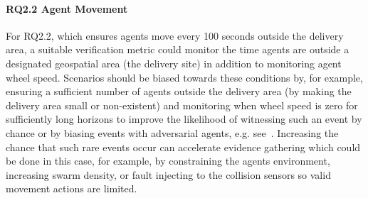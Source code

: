 \documentclass[lettersize,journal]{IEEEtran}
\begin{document}
\paragraph*{RQ2.2 Agent Movement}

For RQ2.2, which ensures agents move every 100 seconds outside the delivery area, a suitable verification metric could monitor the time agents are outside a designated geospatial area (the delivery site) in addition to monitoring agent wheel speed. Scenarios should be biased towards these conditions by, for example, ensuring a sufficient number of agents outside the delivery area (by making the delivery area small or non-existent) and monitoring when wheel speed is zero for sufficiently long horizons to improve the likelihood of witnessing such an event by chance or by biasing events with adversarial agents, e.g. see~\cite{chance2020agency}. Increasing the chance that such rare events occur can accelerate evidence gathering which could be done in this case, for example, by constraining the agents environment, increasing swarm density, or fault injecting to the collision sensors so valid movement actions are limited. 
\end{document}
